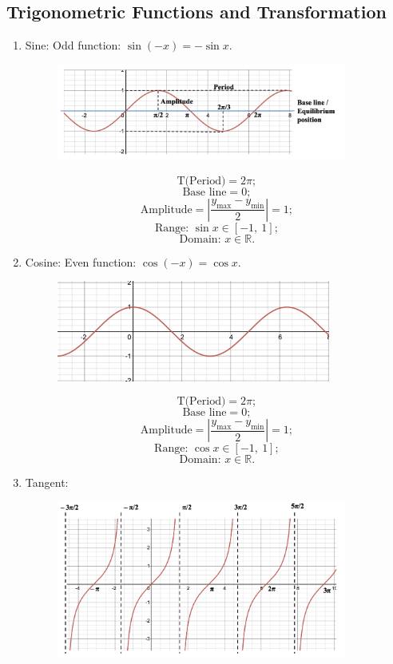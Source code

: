 \documentclass[12pt, a4paper]{article}
\def\R{{\mathbb{R}}}
\begin{document}
\subsection{Trigonometric Functions and Transformation}
\begin{enumerate}
  \item Sine: Odd function: $\sin{(-x)}=-\sin{x}$.
  \begin{figure}[H]
    \centering
    \includegraphics[width=0.9\textwidth]{Fig.3.25.jpg}
  \end{figure}
  $$\text{T(Period)}=2\pi;$$
  $$\text{Base line}=0;$$
  $$\text{Amplitude}=\left|\frac{y_{\text{max}}-y_{\text{min}}}{2}\right|=1;$$
  $$\text{Range: }\sin{x}\in\left[-1,\ 1\right];$$
  $$\text{Domain: }x\in\R.$$
  \item Cosine: Even function: $\cos{(-x)}=\cos{x}$.
  \begin{figure}[H]
    \centering
    \includegraphics[width=0.85\textwidth]{Fig.3.26.jpg}
  \end{figure}
  $$\text{T(Period)}=2\pi;$$
  $$\text{Base line}=0;$$
  $$\text{Amplitude}=\left|\frac{y_{\text{max}}-y_{\text{min}}}{2}\right|=1;$$
  $$\text{Range: }\cos{x}\in\left[-1,\ 1\right];$$
  $$\text{Domain: }x\in\R.$$
  \item Tangent: 
  \begin{figure}[H]
    \centering
    \includegraphics[width=0.9\textwidth]{Fig.3.27.jpg}

\end{figure}
\end{enumerate}
\end{document}
